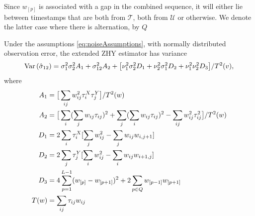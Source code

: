 Since $w_{[p]}$ is associated with a gap in the combined sequence, it will either lie between timestamps that are both from $\mathcal{T}$, both from $\mathcal{U}$ or otherwise.  We denote the latter case where there is alternation, by $Q$
\begin{thm}\label{thm:genZHYnoise}
Under the assumptions \eqref{eq:noiseAssumptions}, with normally distributed observation error, the extended ZHY estimator has variance
$$\text{\rm Var}\, (\hat{\sigma}_{12}) = \sigma^2_1 \sigma^2_2 A_1 + \sigma^2_{12} A_2 + \big[\nu_1^2 \sigma^2_2 D_1 + \nu_2^2\sigma_1^2 D_2 + \nu_1^2 \nu_2^2 D_3\big]/T^2(v),$$
where 
\begin{align} %
A_1 &= \big[\sum_{ij} w_{ij}^2 \tau_i^X \tau_j^Y\big]/T^2(w)  \notag \\
A_2 &= \big[\sum_i (\sum_j w_{ij} \tau_{ij})^2 + \sum_j(\sum_i w_{ij} \tau_{ij})^2 - \sum_{ij} w_{ij}^2 \tau_{ij}^2\big]/T^2(w) \notag\\
D_1 &= 2 \sum_i \tau^X_i [\sum_j w_{ij}^2 - \sum_j w_{ij} w_{i,j+1}]\notag\\
D_2 &= 2 \sum_j \tau^Y_j [\sum_i w_{ij}^2 - \sum_i w_{ij} w_{i+1,j}]\notag\\
D_3 &= 4 \sum_{p=1}^{L-1} (w_{[p]} - w_{[p+1]})^2 + 2 \sum_{p \in Q} w_{[p-1]}w_{[p+1]}\notag\\
T(w)&= \sum_{ij} \tau_{ij} w_{ij}
\end{align}

\end{thm} 

